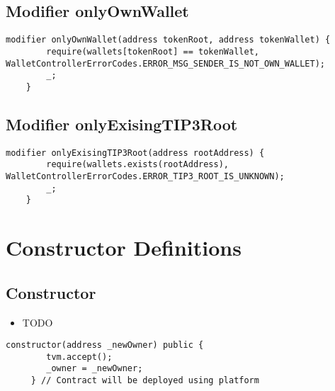 \subsection{Modifier onlyOwnWallet}


\begin{lstlisting}[firstnumber=311]
    modifier onlyOwnWallet(address tokenRoot, address tokenWallet) {
        require(wallets[tokenRoot] == tokenWallet, WalletControllerErrorCodes.ERROR_MSG_SENDER_IS_NOT_OWN_WALLET);
        _;
    }
\end{lstlisting}

\subsection{Modifier onlyExisingTIP3Root}


\begin{lstlisting}[firstnumber=319]
    modifier onlyExisingTIP3Root(address rootAddress) {
        require(wallets.exists(rootAddress), WalletControllerErrorCodes.ERROR_TIP3_ROOT_IS_UNKNOWN);
        _;
    }
\end{lstlisting}

\section{Constructor Definitions}


\subsection{Constructor}

\noindent\begin{itemize}
\item TODO
\end{itemize}

\begin{lstlisting}[firstnumber=43]
    constructor(address _newOwner) public { 
        tvm.accept();
        _owner = _newOwner;
     } // Contract will be deployed using platform
\end{lstlisting}

